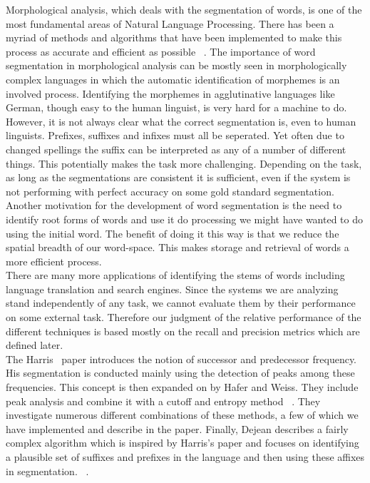 \documentclass[11pt]{article}
\begin{document}
Morphological analysis, which deals with the segmentation of words, is one of 
the most fundamental areas of Natural Language Processing. There has been a 
myriad of methods and algorithms that have been implemented to make this 
process as accurate and efficient as possible ~\cite{hafer1974-word}. The importance of word 
segmentation in morphological analysis can be mostly seen in
morphologically complex languages in which the automatic identification of
morphemes is an involved process. Identifying the morphemes in agglutinative
languages like German, though easy to the human linguist, is very hard for a 
machine to do.\\
However, it is not always clear what the correct segmentation is, even to
human linguists. Prefixes, suffixes and infixes must all be seperated. Yet
often due to changed spellings the suffix can be interpreted as any of a 
number of different things. This potentially makes the task more challenging.
Depending on the task, as long as the segmentations are consistent it is
sufficient, even if the system is not performing with perfect accuracy on some
gold standard segmentation.
Another motivation for the development of word segmentation is the need to 
identify root forms of words and use it do processing we might have wanted to 
do using the initial word. The benefit of doing it this way is that we reduce 
the spatial breadth of our word-space. This makes storage and retrieval of 
words a more efficient process. \\
There are many more applications of identifying the stems of words including
language translation and search engines. Since the systems we are analyzing
stand independently of any task, we cannot evaluate them by their performance
on some external task. Therefore our judgment of the relative performance of
the different techniques is based mostly on the recall and precision metrics 
which are defined later. \\
The Harris~ paper introduces the notion of 
successor and predecessor frequency. His segmentation is conducted mainly
using the detection of peaks among these frequencies. This concept is then
expanded on by Hafer and Weiss. They include
peak analysis and combine it with a cutoff and entropy method
~\cite{hafer1974-word}. They investigate numerous different combinations of
these methods, a few of which we have 
implemented and describe in the paper. Finally, Dejean describes a fairly
complex algorithm which is inspired by Harris's paper and focuses on
identifying a plausible set of suffixes and prefixes in the language and then
using these affixes in segmentation.
~\cite{dejean1998-morphemes}. 
\end{document}
